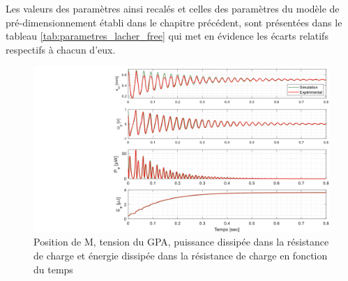 Les valeurs des paramètres ainsi recalés et celles des paramètres du modèle de pré-dimensionnement établi dans le chapitre précédent, sont présentées dans le tableau \ref{tab:parametres_lacher_free} qui met en évidence les écarts relatifs respectifs à chacun d'eux.
\begin{figure}[!ht]
\begin{center}
    \captionsetup{justification=centering}
	\includegraphics[trim={9cm 0cm 0cm 0cm},clip, width=\textwidth]{../Chap3/Figure/BDT_correlation_simu_exp_lacher.pdf}
	\caption{Position de M, tension du GPA, puissance dissipée dans la résistance de charge et énergie dissipée dans la résistance de charge en fonction du temps}
	\label{fig:BDT_correlation_simu_exp_lacher}
\end{center}
\end{figure}

